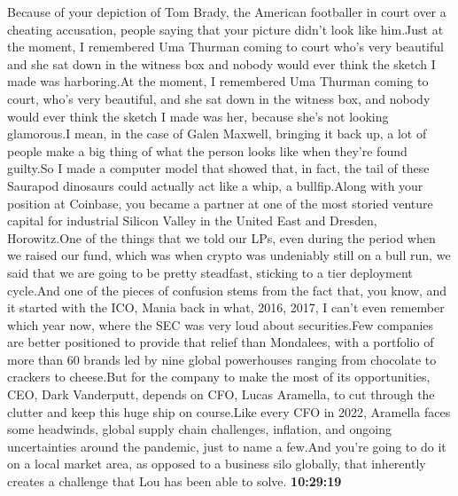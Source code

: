 \documentclass{article}%
\begin{document}
Because of your depiction of Tom Brady, the American footballer in court over a cheating accusation, people saying that your picture didn't look like him.Just at the moment, I remembered Uma Thurman coming to court who's very beautiful and she sat down in the witness box and nobody would ever think the sketch I made was harboring.At the moment, I remembered Uma Thurman coming to court, who's very beautiful, and she sat down in the witness box, and nobody would ever think the sketch I made was her, because she's not looking glamorous.I mean, in the case of Galen Maxwell, bringing it back up, a lot of people make a big thing of what the person looks like when they're found guilty.So I made a computer model that showed that, in fact, the tail of these Saurapod dinosaurs could actually act like a whip, a bullfip.Along with your position at Coinbase, you became a partner at one of the most storied venture capital for industrial Silicon Valley in the United East and Dresden, Horowitz.One of the things that we told our LPs, even during the period when we raised our fund, which was when crypto was undeniably still on a bull run, we said that we are going to be pretty steadfast, sticking to a tier deployment cycle.And one of the pieces of confusion stems from the fact that, you know, and it started with the ICO, Mania back in what, 2016, 2017, I can't even remember which year now, where the SEC was very loud about securities.Few companies are better positioned to provide that relief than Mondalees, with a portfolio of more than 60 brands led by nine global powerhouses ranging from chocolate to crackers to cheese.But for the company to make the most of its opportunities, CEO, Dark Vanderputt, depends on CFO, Lucas Aramella, to cut through the clutter and keep this huge ship on course.Like every CFO in 2022, Aramella faces some headwinds, global supply chain challenges, inflation, and ongoing uncertainties around the pandemic, just to name a few.And you're going to do it on a local market area, as opposed to a business silo globally, that inherently creates a challenge that Lou has been able to solve.%
\textbf{10:29:19}%
\newline%
\end{document}
